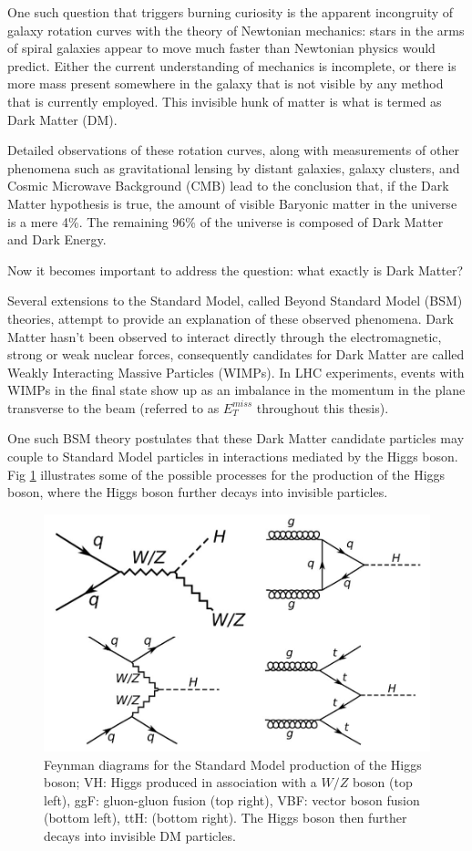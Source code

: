 \documentclass[11pt,a4paper]{report}
\newcommand{\met}{$E_T^{miss}$ }
\begin{document}
One such question that triggers burning curiosity is the apparent incongruity of galaxy rotation curves with the theory of Newtonian mechanics: stars in the arms of spiral galaxies appear to move much faster than Newtonian physics would predict. Either the current understanding of mechanics is incomplete, or there is more mass present somewhere in the galaxy that is not visible by any method that is currently employed. This invisible hunk of matter is what is termed as Dark Matter (DM).

Detailed observations of these rotation curves, along with measurements of other phenomena such as gravitational lensing by distant galaxies, galaxy clusters, and Cosmic Microwave Background (CMB) lead to the conclusion that, if the Dark Matter hypothesis is true, the amount of visible Baryonic matter in the universe is a mere 4\%. The remaining 96\% of the universe is composed of Dark Matter and Dark Energy.

Now it becomes important to address the question: what exactly is Dark Matter? 

Several extensions to the Standard Model, called Beyond Standard Model (BSM) theories, attempt to provide an explanation of these observed phenomena. Dark Matter hasn't been observed to interact directly through the electromagnetic, strong or weak nuclear forces, consequently candidates for Dark Matter are called Weakly Interacting Massive Particles (WIMPs). In LHC experiments, events with WIMPs in the final state show up as an imbalance in the momentum in the plane transverse to the beam (referred to as \met throughout this thesis).

One such BSM theory postulates that these Dark Matter candidate particles may couple to Standard Model particles in interactions mediated by the Higgs boson. Fig \ref{fig:higgs} illustrates some of the possible processes for the production of the Higgs boson, where the Higgs boson further decays into invisible particles.

\begin{figure}[H]
\centering
\includegraphics[width=0.5\linewidth]{higgs_production.png}
\caption{Feynman diagrams for the Standard Model production of the Higgs boson; VH: Higgs produced in association with a $W/Z$ boson (top left), ggF: gluon-gluon fusion (top right), VBF: vector boson fusion (bottom left), ttH: (bottom right). The Higgs boson then further decays into invisible DM particles.}
\label{fig:higgs}
\end{figure}
\end{document}
